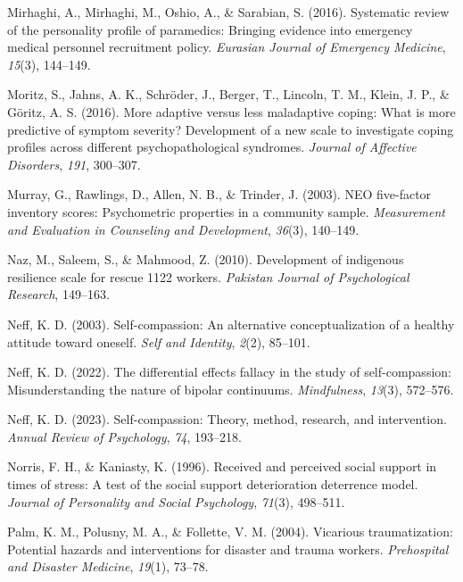 \documentclass[
  man,floatsintext]{apa7}
\newlength{\cslhangindent}
\newlength{\cslentryspacingunit} %
\newenvironment{CSLReferences}[2] %
 {%
  \setlength{\parindent}{0pt}
  \ifodd #1
  \let\oldpar\par
  \def\par{\hangindent=\cslhangindent\oldpar}
  \fi
  \setlength{\parskip}{#2\cslentryspacingunit}
 }%
 {}
\begin{document}
\begin{CSLReferences}{1}{0}
\leavevmode{}%
Mirhaghi, A., Mirhaghi, M., Oshio, A., \& Sarabian, S. (2016). Systematic review of the personality profile of paramedics: Bringing evidence into emergency medical personnel recruitment policy. \emph{Eurasian Journal of Emergency Medicine}, \emph{15}(3), 144--149.

\leavevmode{}%
Moritz, S., Jahns, A. K., Schröder, J., Berger, T., Lincoln, T. M., Klein, J. P., \& Göritz, A. S. (2016). More adaptive versus less maladaptive coping: What is more predictive of symptom severity? Development of a new scale to investigate coping profiles across different psychopathological syndromes. \emph{Journal of Affective Disorders}, \emph{191}, 300--307.

\leavevmode{}%
Murray, G., Rawlings, D., Allen, N. B., \& Trinder, J. (2003). NEO five-factor inventory scores: Psychometric properties in a community sample. \emph{Measurement and Evaluation in Counseling and Development}, \emph{36}(3), 140--149.

\leavevmode{}%
Naz, M., Saleem, S., \& Mahmood, Z. (2010). Development of indigenous resilience scale for rescue 1122 workers. \emph{Pakistan Journal of Psychological Research}, 149--163.

\leavevmode{}%
Neff, K. D. (2003). Self-compassion: An alternative conceptualization of a healthy attitude toward oneself. \emph{Self and Identity}, \emph{2}(2), 85--101.

\leavevmode{}%
Neff, K. D. (2022). The differential effects fallacy in the study of self-compassion: Misunderstanding the nature of bipolar continuums. \emph{Mindfulness}, \emph{13}(3), 572--576.

\leavevmode{}%
Neff, K. D. (2023). Self-compassion: Theory, method, research, and intervention. \emph{Annual Review of Psychology}, \emph{74}, 193--218.

\leavevmode{}%
Norris, F. H., \& Kaniasty, K. (1996). Received and perceived social support in times of stress: A test of the social support deterioration deterrence model. \emph{Journal of Personality and Social Psychology}, \emph{71}(3), 498--511.

\leavevmode{}%
Palm, K. M., Polusny, M. A., \& Follette, V. M. (2004). Vicarious traumatization: Potential hazards and interventions for disaster and trauma workers. \emph{Prehospital and Disaster Medicine}, \emph{19}(1), 73--78.


\end{CSLReferences}
\end{document}
